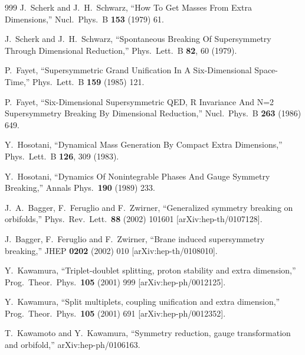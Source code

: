 \begin{thebibliography}{999}
  J.~Scherk and J.~H.~Schwarz,
  ``How To Get Masses From Extra Dimensions,''
  Nucl.\ Phys.\ B {\bf 153} (1979) 61.

  J.~Scherk and J.~H.~Schwarz,
  ``Spontaneous Breaking Of Supersymmetry Through Dimensional Reduction,''
  Phys.\ Lett.\ B {\bf 82}, 60 (1979).

  P.~Fayet,
  ``Supersymmetric Grand Unification In A Six-Dimensional Space-Time,''
  Phys.\ Lett.\ B {\bf 159} (1985) 121.

  P.~Fayet,
  ``Six-Dimensional Supersymmetric QED, R Invariance And N=2 Supersymmetry
  Breaking By Dimensional Reduction,''
  Nucl.\ Phys.\ B {\bf 263} (1986) 649.

  Y.~Hosotani,
  ``Dynamical Mass Generation By Compact Extra Dimensions,''
  Phys.\ Lett.\ B {\bf 126}, 309 (1983).

  Y.~Hosotani,
  ``Dynamics Of Nonintegrable Phases And Gauge Symmetry Breaking,''
  Annals Phys.\  {\bf 190} (1989) 233.

  J.~A.~Bagger, F.~Feruglio and F.~Zwirner,
  ``Generalized symmetry breaking on orbifolds,''
  Phys.\ Rev.\ Lett.\  {\bf 88} (2002) 101601
  [arXiv:hep-th/0107128].

  J.~Bagger, F.~Feruglio and F.~Zwirner,
  ``Brane induced supersymmetry breaking,''
  JHEP {\bf 0202} (2002) 010
  [arXiv:hep-th/0108010].

  Y.~Kawamura,
  ``Triplet-doublet splitting, proton stability and extra dimension,''
  Prog.\ Theor.\ Phys.\  {\bf 105} (2001) 999
  [arXiv:hep-ph/0012125].

  Y.~Kawamura,
  ``Split multiplets, coupling unification and extra dimension,''
  Prog.\ Theor.\ Phys.\  {\bf 105} (2001) 691
  [arXiv:hep-ph/0012352].

  T.~Kawamoto and Y.~Kawamura,
  ``Symmetry reduction, gauge transformation and orbifold,''
  arXiv:hep-ph/0106163.


\end{thebibliography}
